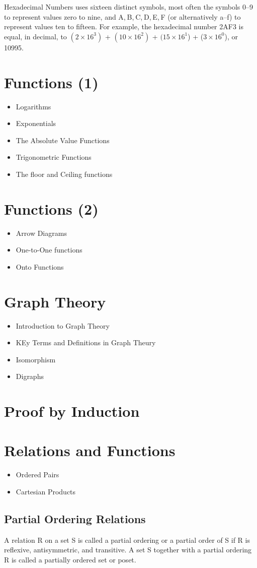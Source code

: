  
Hexadecimal Numbers uses sixteen distinct symbols, most often the symbols 0–9 to represent values zero to nine, and A, B, C, D, E, F (or alternatively a–f) to represent values ten to fifteen. For example, the hexadecimal number 2AF3 is equal, in decimal, to $(2 \times 16^3)$ + $(10 \times 16^2)$ + $(15 \times 16^1$) + ($3 \times 16^0$), or 10995.

\newpage
\section{Functions (1)}
\begin{itemize}
\item Logarithms
\item Exponentials
\item The Absolute Value Functions
\item Trigonometric Functions
\item The floor and Ceiling functions
\end{itemize}
\section{Functions (2)}
\begin{itemize}
\item Arrow Diagrams
\item One-to-One functions
\item Onto Functions
\end{itemize}

\section{Graph Theory}
\begin{itemize}
\item Introduction to Graph Theory
\item KEy Terms and Definitions in Graph Theury
\item Isomorphism
\item Digraphs
\end{itemize}


\section{Proof by Induction}


\section{Relations and Functions}
\begin{itemize}
\item Ordered Pairs
\item Cartesian Products
\end{itemize}

\subsection*{Partial Ordering Relations}
A relation R on a set S is called a partial ordering or a partial order of S if R is reflexive, antisymmetric, and
transitive. A set S together with a partial ordering R is called a partially ordered set or poset.



